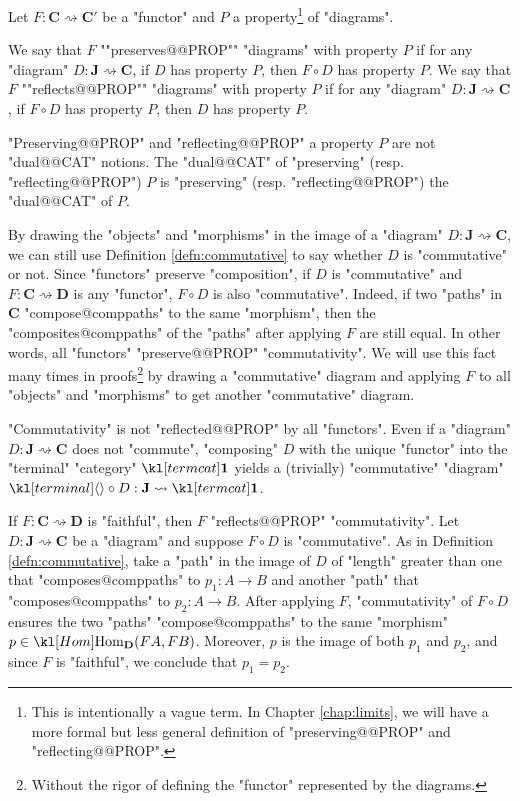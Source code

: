 \documentclass[main.tex]{subfiles}
\begin{document}
\begin{defn}\label{defn:presreflprop}
	Let $F: \mathbf{C} \rightsquigarrow \mathbf{C}'$ be a "functor" and $P$ a property\footnote{This is intentionally a vague term. In Chapter \ref{chap:limits}, we will have a more formal but less general definition of "preserving@@PROP" and "reflecting@@PROP".} of "diagrams".
	\begin{itemize}
		\itemAP[-] We say that $F$ ""preserves@@PROP"" "diagrams" with property $P$ if for any "diagram" $D: \mathbf{J} \rightsquigarrow \mathbf{C}$, if $D$ has property $P$, then $F \circ D$ has property $P$.
		\itemAP[-] We say that $F$ ""reflects@@PROP"" "diagrams" with property $P$ if for any "diagram" $D: \mathbf{J} \rightsquigarrow \mathbf{C}$, if $F \circ D$ has property $P$, then $D$ has property $P$.
	\end{itemize}
\end{defn}
\begin{warn}
	"Preserving@@PROP" and "reflecting@@PROP" a property $P$ are not "dual@@CAT" notions. The "dual@@CAT" of "preserving" (resp. "reflecting@@PROP") $P$ is "preserving" (resp. "reflecting@@PROP") the "dual@@CAT" of $P$. 
\end{warn}
\begin{exmp}["Commutativity"]
	By drawing the "objects" and "morphisms" in the image of a "diagram" $D: \mathbf{J} \rightsquigarrow \mathbf{C}$, we can still use Definition \ref{defn:commutative} to say whether $D$ is "commutative" or not. Since "functors" preserve "composition", if $D$ is "commutative" and $F: \mathbf{C} \rightsquigarrow \mathbf{D}$ is any "functor", $F\circ D$ is also "commutative". Indeed, if two "paths" in $\mathbf{C}$ "compose@comppaths" to the same "morphism", then the "composites@comppaths" of the "paths" after applying $F$ are still equal. In other words, all "functors" "preserve@@PROP" "commutativity". We will use this fact many times in proofs\footnote{Without the rigor of defining the "functor" represented by the diagrams.} by drawing a "commutative" diagram and applying $F$ to all "objects" and "morphisms" to get another "commutative" diagram.

	"Commutativity" is not "reflected@@PROP" by all "functors". Even if a "diagram" $D: \mathbf{J} \rightsquigarrow \mathbf{C}$ does not "commute", "composing" $D$ with the unique "functor" into the "terminal" "category" $\termcat$ yields a (trivially) "commutative" "diagram" $\termmorph \circ D : \mathbf{J} \rightsquigarrow \termcat$.

	If $F: \mathbf{C} \rightsquigarrow \mathbf{D}$ is "faithful", then $F$ "reflects@@PROP" "commutativity". Let $D: \mathbf{J} \rightsquigarrow \mathbf{C}$ be a "diagram" and suppose $F \circ D$ is "commutative". As in Definition \ref{defn:commutative}, take a "path" in the image of $D$ of "length" greater than one that "composes@comppaths" to $p_1: A \rightarrow B$ and another "path" that "composes@comppaths" to $p_2 : A \rightarrow B$. After applying $F$, "commutativity" of $F\circ D$ ensures the two "paths" "compose@comppaths" to the same "morphism" $p \in \Hom_{\mathbf{D}}(FA, FB)$. Moreover, $p$ is the image of both $p_1$ and $p_2$, and since $F$ is "faithful", we conclude that $p_1 = p_2$.
\end{exmp}
\end{document}
